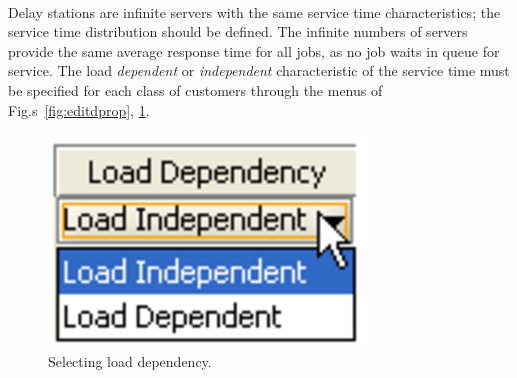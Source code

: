 \\ Delay stations are infinite
servers with the same service time characteristics; the service
time distribution should be defined. The infinite numbers of
servers provide the same  average response time for all jobs, as
no job waits in queue for service. The load \emph{dependent} or
\emph{independent} characteristic of the service time must be
specified for each class of customers through the menus of
Fig.s~\ref{fig:editdprop}, \ref{fig:selloaddep}.
\begin{figure}[htb]
    \begin{center}
        \includegraphics[scale=.5]{img/jsimg/8.16.eps}
    \end{center}
    \caption{Selecting load dependency.}
    \label{fig:selloaddep}
\end{figure}

